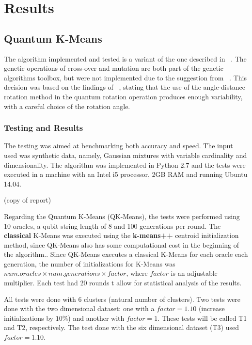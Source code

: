 
\chapter{Results}
\label{chapter:results}
\section{Quantum K-Means}


The algorithm implemented and tested is a variant of the one described in ~\cite{Casper}. The genetic operations of cross-over and mutation are both part of the genetic algorithms toolbox, but were not implemented due to the suggestion from ~\cite{Wiebe2014}. This decision was based on the findings of ~\cite{Liu2010}, stating that the use of the angle-distance rotation method in the quantum rotation operation produces enough variability, with a careful choice of the rotation angle.

\subsection{Testing and Results}
The testing was aimed at benchmarking both accuracy and speed. The input used was synthetic data, namely, Gaussian mixtures with variable cardinality and dimensionality. The algorithm was implemented in Python 2.7 and the tests were executed in a machine with an Intel i5 processor, 2GB RAM and running Ubuntu 14.04.

(copy of report)

Regarding the Quantum K-Means (QK-Means), the tests were performed using 10 oracles, a qubit string length of 8 and 100 generations per round. The \textbf{classical} K-Means was executed using the \textbf{k-means++} centroid initialization method, since QK-Means also has some computational cost in the beginning of the algorithm.. Since QK-Means executes a classical K-Means for each oracle each generation, the number of initializations for K-Means was $num.oracles \times num.generations \times factor$, where $factor$ is an adjustable multiplier. Each test had 20 rounds t allow for statistical analysis of the results.

All tests were done with 6 clusters (natural number of clusters). Two tests were done with the two dimensional dataset: one with a $factor=1.10$ (increase initializations by $10\%$) and another with $factor=1$. These tests will be called T1 and T2, respectively. The test done with the six dimensional dataset (T3) used $factor=1.10$.

